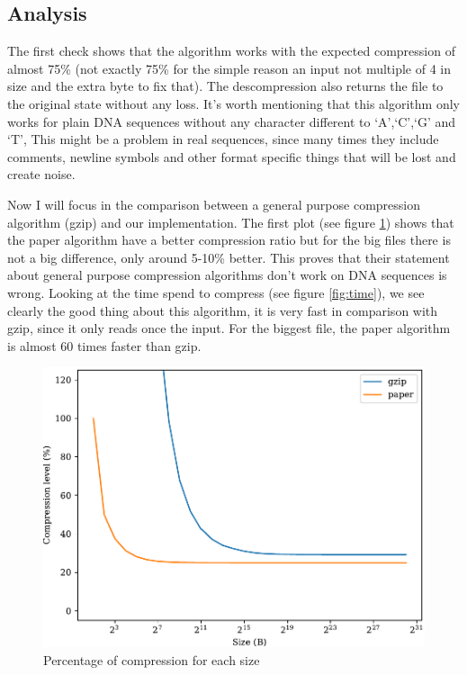 \documentclass[conference,a4paper]{IEEEtran}
\begin{document}
\subsection{Analysis}
The first check shows that the algorithm works with the expected compression of almost 75\% (not exactly 75\% for the simple reason an input not multiple of 4 in size and the extra byte to fix that). The descompression also returns the file to the original state without any loss. It's worth mentioning that this algorithm only works for plain DNA sequences without any character different to `A',`C',`G' and `T', This might be a problem in real sequences, since many times they include comments, newline symbols and other format specific things that will be lost and create noise.

Now I will focus in the comparison between a general purpose compression algorithm (gzip) and our implementation. The first plot (see figure \ref{fig:compression}) shows that the paper algorithm have a better compression ratio but for the big files there is not a big difference, only around 5-10\% better. This proves that their statement about general purpose compression algorithms don't work on DNA sequences is wrong. Looking at the time spend to compress (see figure \ref{fig:time}), we see clearly the good thing about this algorithm, it is very fast in comparison with gzip, since it only reads once the input. For the biggest file, the paper algorithm is almost 60 times faster than gzip.

\begin{figure}[htbp]
    \centering
    \includegraphics[width=0.95\linewidth]{../plots/compression.pdf}
    \caption{Percentage of compression for each size}
    \label{fig:compression}
\end{figure}
\end{document}
